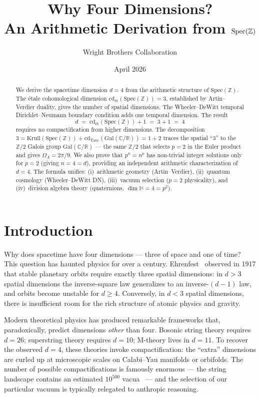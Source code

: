 \documentclass[12pt,a4paper]{article}
\title{\textbf{Why Four Dimensions?\\An Arithmetic Derivation from $\Spec(\ZZ)$}}
\author{Wright Brothers Collaboration}
\date{April 2026}
\theoremstyle{definition}
\newcommand{\Spec}{\mathrm{Spec}}
\newcommand{\Gal}{\mathrm{Gal}}
\newcommand{\cd}{\mathrm{cd}}
\newcommand{\Krull}{\mathrm{Krull}}
\newcommand{\ZZ}{\mathbb{Z}}
\newcommand{\RR}{\mathbb{R}}
\newcommand{\CC}{\mathbb{C}}
\newcommand{\HH}{\mathbb{H}}
\begin{document}
\maketitle

\begin{abstract}
We derive the spacetime dimension $d=4$ from the arithmetic structure of $\Spec(\ZZ)$.
The \'etale cohomological dimension $\cd_{\text{\'et}}(\Spec(\ZZ)) = 3$, established by
Artin--Verdier duality, gives the number of spatial dimensions. The Wheeler--DeWitt
temporal Dirichlet--Neumann boundary condition adds one temporal dimension. The result
\[
  d \;=\; \cd_{\text{\'et}}(\Spec(\ZZ)) + 1 \;=\; 3 + 1 \;=\; 4
\]
requires no compactification from higher dimensions. The decomposition
$3 = \Krull(\Spec(\ZZ)) + \cd_{\mathrm{Tate}}(\Gal(\CC/\RR)) = 1 + 2$ traces the
spatial ``3'' to the $\ZZ/2$ Galois group $\Gal(\CC/\RR)$ --- the same $\ZZ/2$ that
selects $p=2$ in the Euler product and gives $\Omega_\Lambda = 2\pi/9$. We also prove
that $p^n = n^p$ has non-trivial integer solutions only for $p=2$ (giving $n=4=d$),
providing an independent arithmetic characterization of $d=4$. The formula unifies:
(i)~arithmetic geometry (Artin--Verdier), (ii)~quantum cosmology (Wheeler--DeWitt DN),
(iii)~vacuum selection ($p=2$ physicality), and (iv)~division algebra theory
(quaternions, $\dim \HH = 4 = p^2$).
\end{abstract}

\tableofcontents

\section{Introduction}\label{sec:intro}

Why does spacetime have four dimensions --- three of space and one of time? This
question has haunted physics for over a century. Ehrenfest~\cite{Ehrenfest1917}
observed in 1917 that stable planetary orbits require exactly three spatial
dimensions: in $d>3$ spatial dimensions the inverse-square law generalizes to an
inverse-$(d-1)$ law, and orbits become unstable for $d \geq 4$. Conversely, in
$d < 3$ spatial dimensions, there is insufficient room for the rich structure of
atomic physics and gravity.

Modern theoretical physics has produced remarkable frameworks that, paradoxically,
predict dimensions \emph{other} than four. Bosonic string theory requires $d=26$;
superstring theory requires $d=10$; M-theory lives in $d=11$. To recover the observed
$d=4$, these theories invoke compactification: the ``extra'' dimensions are curled up
at microscopic scales on Calabi--Yau manifolds or orbifolds. The number of possible
compactifications is famously enormous --- the string landscape contains an estimated
$10^{500}$ vacua~\cite{Bousso2000,KKLT2003} --- and the selection of our particular
vacuum is typically relegated to anthropic reasoning.
\end{document}
